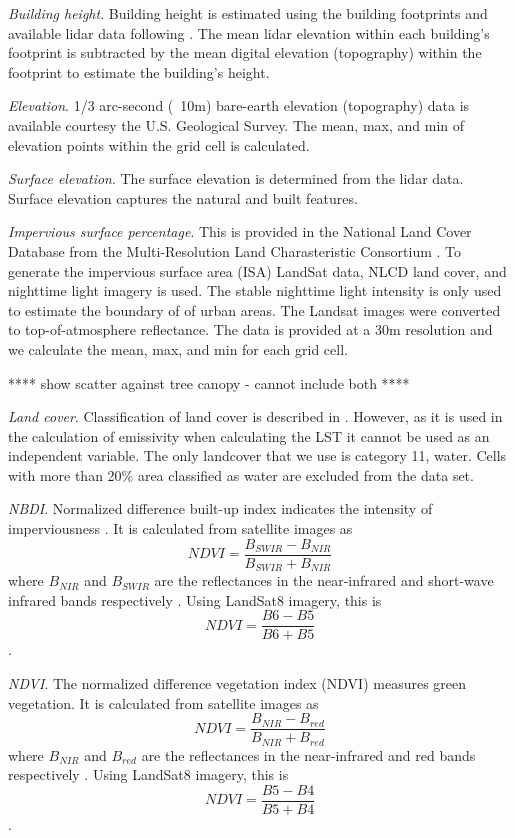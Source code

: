 \documentclass[final,3p,times,twocolumn,sort&compress]{elsarticle}
\begin{document}
\textit{Building height}. Building height is estimated using the building footprints and available lidar data following \cite{Chun2017-mm}. The mean lidar elevation within each building's footprint is subtracted by the mean digital elevation (topography) within the footprint to estimate the building's height.

\textit{Elevation}. 1/3 arc-second (~10m) bare-earth elevation (topography) data is available courtesy the U.S. Geological Survey. The mean, max, and min of elevation points within the grid cell is calculated.

\textit{Surface elevation}. The surface elevation is determined from the lidar data. Surface elevation captures the natural and built features. 

\textit{Impervious surface percentage}. This is provided in the National Land Cover Database from the Multi-Resolution Land Charasteristic Consortium \cite{Xian2011-aa}. To generate the impervious surface area (ISA) LandSat data, NLCD land cover, and nighttime light imagery is used. The stable nighttime light intensity is only used to estimate the boundary of of urban areas. The Landsat images were converted to top-of-atmosphere reflectance. The data is provided at a 30m resolution and we calculate the mean, max, and min for each grid cell.

**** show scatter against tree canopy - cannot include both ****

\textit{Land cover}. Classification of land cover is described in \cite{Homer2015-ce}. However, as it is used in the calculation of emissivity when calculating the LST it cannot be used as an independent variable. The only landcover that we use is category 11, water. Cells with more than 20\% area classified as water are excluded from the data set.

\textit{NBDI}. Normalized difference built-up index indicates the intensity of imperviousness \cite{Bhatti2014-ae}. It is calculated from satellite images as $$NDVI=\frac{B_{SWIR}-B_{NIR}}{B_{SWIR}+B_{NIR}}$$ where $B_{NIR}$ and $B_{SWIR}$ are the reflectances in the near-infrared and short-wave infrared bands respectively \cite{Alhawiti2016-wv}. Using LandSat8 imagery, this is $$NDVI=\frac{B6-B5}{B6+B5}$$ \cite{barsi2014}.

\textit{NDVI}. The normalized difference vegetation index (NDVI) measures green vegetation. It is calculated from satellite images as $$NDVI=\frac{B_{NIR}-B_{red}}{B_{NIR}+B_{red}}$$ where $B_{NIR}$ and $B_{red}$ are the reflectances in the near-infrared and red bands respectively \cite{Alhawiti2016-wv}. Using LandSat8 imagery, this is $$NDVI=\frac{B5-B4}{B5+B4}$$ \cite{barsi2014}.
\end{document}
